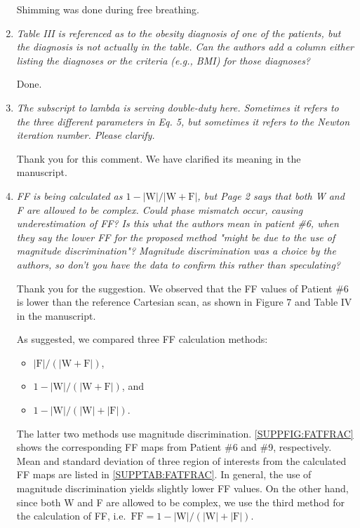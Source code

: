 \documentclass[a4paper,11pt]{report}
\begin{document}
\begin{enumerate}[resume]
\hspace{1em} Shimming was done during free breathing.

	\item \textit{Table III is referenced as to the obesity diagnosis of one of the patients, but the diagnosis is not actually in the table. Can the authors add a column either listing the diagnoses or the criteria (e.g., BMI) for those diagnoses?}

\hspace{1em} Done.

	\item \textit{The subscript to lambda is serving double-duty here. Sometimes it refers to the three different parameters in Eq. 5, but sometimes it refers to the Newton iteration number. Please clarify.}

\hspace{1em} Thank you for this comment. We have clarified its meaning in the manuscript.

	\item \textit{FF is being calculated as $1 - |\text{W}|/|\text{W}+\text{F}|$, but Page 2 says that both W and F are allowed to be complex. Could phase mismatch occur, causing underestimation of FF?  Is this what the authors mean in patient \#6, when they say the lower FF for the proposed method "might be due to the use of magnitude discrimination"? Magnitude discrimination was a choice by the authors, so don't you have the data to confirm this rather than speculating?}

\hspace{1em} Thank you for the suggestion. We observed that the FF values of 
Patient \#6 is lower than the reference Cartesian scan, 
as shown in Figure 7 and Table IV in the manuscript.

\hspace{1em} As suggested, we compared three FF calculation methods: 
\begin{itemize}
	\item $|\mathrm{F}|/(|\mathrm{W} + \mathrm{F}|)$, 
	\item $1 - |\mathrm{W}|/(|\mathrm{W} + \mathrm{F}|)$, and 
	\item $1 - |\mathrm{W}|/(|\mathrm{W}| + |\mathrm{F}|)$. 
\end{itemize}
The latter two methods use magnitude discrimination.
\cref{SUPPFIG:FATFRAC} shows the corresponding FF maps from Patient \#6 and \#9, respectively.
Mean and standard deviation of three region of interests from the calculated FF maps are listed 
in \cref{SUPPTAB:FATFRAC}. 
In general, the use of magnitude discrimination yields slightly lower FF values. 
On the other hand, since both W and F are allowed to be complex, 
we use the third method for the calculation of FF, 
i.e.~$\mathrm{FF} = 1 - |\mathrm{W}| / (|\mathrm{W}| + |\mathrm{F}|)$.


\end{enumerate}
\end{document}
